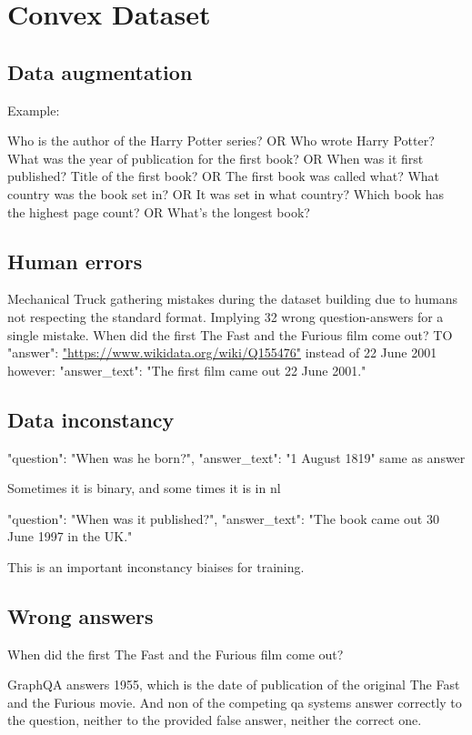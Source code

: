 \section{Convex Dataset}
\subsection{Data augmentation}
Example:

Who is the author of the Harry Potter series? OR Who wrote Harry Potter?
What was the year of publication for the first book? OR When was it first published?
Title of the first book? OR The first book was called what?
What country was the book set in? OR It was set in what country?
Which book has the highest page count? OR What's the longest book?


\subsection{Human errors}
Mechanical Truck gathering mistakes during the dataset building due to humans not respecting the standard format. Implying 32 wrong question-answers for a single mistake.
When did the first The Fast and the Furious film come out?
TO "answer": \url{"https://www.wikidata.org/wiki/Q155476"} instead of 22 June 2001
however: "answer\_text": "The first film came out 22 June 2001."

\subsection{Data inconstancy}
"question": "When was he born?",
"answer\_text": "1 August 1819" same as answer

Sometimes it is binary, and some times it is in \gls{nl}

"question": "When was it published?", 
"answer\_text": "The book came out 30 June 1997 in the UK."

This is an important inconstancy biaises for training.

\subsection{Wrong answers}
When did the first The Fast and the Furious film come out?

GraphQA answers 1955, which is the date of publication of the original The Fast and the Furious movie. And non of the competing qa systems answer correctly to the question, neither to the provided false answer, neither the correct one.

